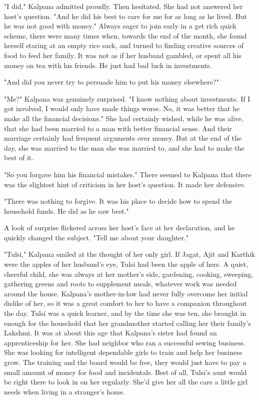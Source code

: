 \documentclass{amsart}
\begin{document}
	"I did," Kalpana admitted proudly. Then hesitated. She had not answered her
	host's question. "And he did his best to care for me for as long as he lived.
	But he was not good with money." Always eager to join early in a get rich quick
	scheme, there were many times when, towards the end of the month, she found
	herself staring at an empty rice sack, and turned to finding creative sources of
	food to feed her family. It was not as if her husband gambled, or spent all his
	money on tea with his friends. He just had bad luck in investments.
	
	"And did you never try to persuade him to put his money elsewhere?"
	
	"Me?" Kalpana was genuinely surprised. "I know nothing about investments. If I
	got involved, I would only have made things worse. No, it was better that he
	make all the financial decisions." She had certainly wished, while he was alive,
	that she had been married to a man with better financial sense. And their
	marriage certainly had frequent arguments over money. But at the end of the day,
	she was married to the man she was married to, and she had to make the best of
	it.
	
	"So you forgave him his financial mistakes." There seemed to Kalpana that there
	was the slightest hint of criticism in her host's question. It made her
	defensive.
	
	"There was nothing to forgive. It was his place to decide how to spend the
	household funds. He did as he saw best."
	
	A look of surprise flickered across her host's face at her declaration, and he
	quickly changed the subject. "Tell me about your daughter."
	
	"Tulsi," Kalpana smiled at the thought of her only girl. If Jagat, Ajit and
	Karthik were the apples of her husband's eye, Tulsi had been the apple of hers.
	A quiet, cheerful child, she was always at her mother's side, gardening,
	cooking, sweeping, gathering greens and roots to supplement meals, whatever work
	was needed around the house. Kalpana's mother-in-law had never fully overcome
	her initial dislike of her, so it was a great comfort to her to have a companion
	throughout the day. Tulsi was a quick learner, and by the time she was ten, she
	brought in enough for the household that her grandmother started calling her
	their family's Lakshmi. It was at about this age that Kalpana's sister had 
	found an apprenticeship for her. She had neighbor who ran a successful sewing 
	business. She was looking for intelligent
	dependable girls to train and help her business grow. The training and the board
	would be free, they would just have to pay a small amount of money for food and
	incidentals. Best of all, Tulsi's aunt would be right there to look in on her regularly.
	She'd give her all the care a little girl needs when living in a stranger's home. 
	
\end{document}

